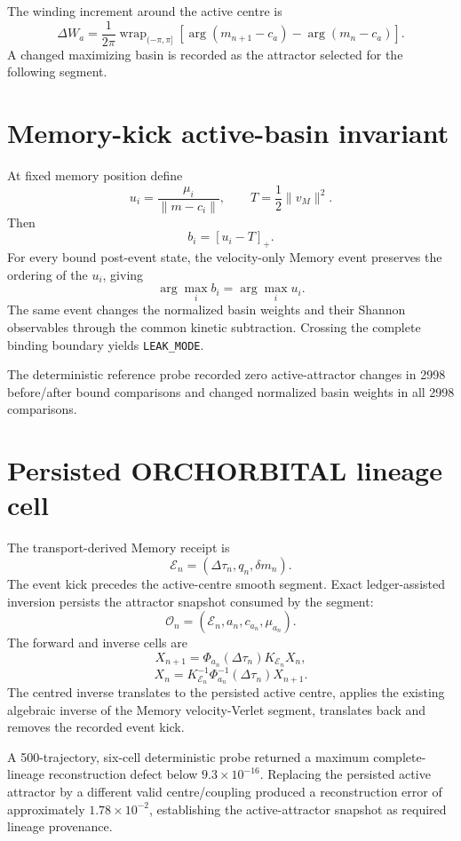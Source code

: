 The winding increment around the active centre is
\[
\boxed{
\Delta W_a
=\frac{1}{2\pi}
\operatorname{wrap}_{(-\pi,\pi]}
\left[
\arg(m_{n+1}-c_a)-\arg(m_n-c_a)
\right].
}
\]
A changed maximizing basin is recorded as the attractor selected for the following segment.

\section{Memory-kick active-basin invariant}

At fixed memory position define
\[
u_i=\frac{\mu_i}{\|m-c_i\|},
\qquad
T=\frac12\|v_M\|^2.
\]
Then
\[
\boxed{b_i=[u_i-T]_+.}
\]
For every bound post-event state, the velocity-only Memory event preserves the ordering of the \(u_i\), giving
\[
\boxed{
\arg\max_i b_i=\arg\max_i u_i.
}
\]
The same event changes the normalized basin weights and their Shannon observables through the common kinetic subtraction. Crossing the complete binding boundary yields \texttt{LEAK\_MODE}.

The deterministic reference probe recorded zero active-attractor changes in 2998 before/after bound comparisons and changed normalized basin weights in all 2998 comparisons.

\section{Persisted ORCHORBITAL lineage cell}

The transport-derived Memory receipt is
\[
\mathcal E_n=(\Delta\tau_n,q_n,\delta m_n).
\]
The event kick precedes the active-centre smooth segment. Exact ledger-assisted inversion persists the attractor snapshot consumed by the segment:
\[
\boxed{
\mathcal O_n=(\mathcal E_n,a_n,c_{a_n},\mu_{a_n}).
}
\]
The forward and inverse cells are
\[
\boxed{
X_{n+1}=\Phi_{a_n}(\Delta\tau_n)K_{\mathcal E_n}X_n,
}
\]
\[
\boxed{
X_n=K_{\mathcal E_n}^{-1}\Phi_{a_n}^{-1}(\Delta\tau_n)X_{n+1}.
}
\]
The centred inverse translates to the persisted active centre, applies the existing algebraic inverse of the Memory velocity-Verlet segment, translates back and removes the recorded event kick.

A 500-trajectory, six-cell deterministic probe returned a maximum complete-lineage reconstruction defect below \(9.3\times10^{-16}\). Replacing the persisted active attractor by a different valid centre/coupling produced a reconstruction error of approximately \(1.78\times10^{-2}\), establishing the active-attractor snapshot as required lineage provenance.

